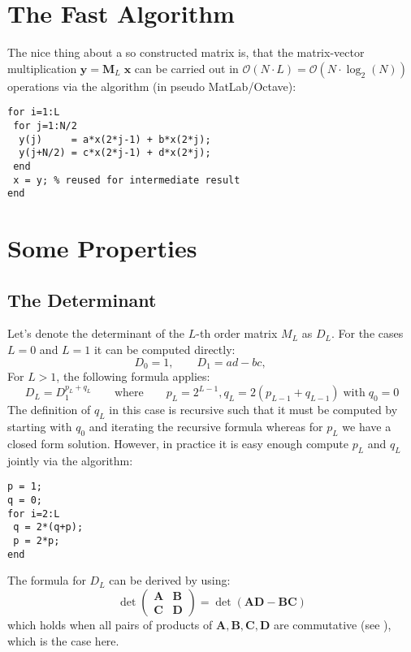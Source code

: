 \section{The Fast Algorithm}
The nice thing about a so constructed matrix is, that the matrix-vector multiplication $\mathbf{y} = \mathbf{M}_L \; \mathbf{x}$ can be carried out in $\mathcal{O}(N \cdot L) = \mathcal{O}(N \cdot \log_2(N))$ operations via the algorithm (in pseudo MatLab/Octave):
\begin{verbatim}
for i=1:L
 for j=1:N/2
  y(j)     = a*x(2*j-1) + b*x(2*j);
  y(j+N/2) = c*x(2*j-1) + d*x(2*j);  
 end
 x = y; % reused for intermediate result
end
\end{verbatim}

\section{Some Properties}

\subsection{The Determinant}
Let's denote the determinant of the $L$-th order matrix $M_L$ as $D_L$. For the cases $L=0$ and $L=1$ it can be computed directly:
\begin{equation}
 D_0 = 1,             \qquad
 D_1 = a d - b c,     \qquad
\end{equation}
For $L > 1$, the following formula applies:
\begin{equation} 
 D_L = D_1^{p_L+q_L} 
 \qquad \text{where} \qquad
 p_L = 2^{L-1}, q_L = 2 (p_{L-1} + q_{L-1}) \; \text{with} \; q_0 = 0
\end{equation}
The definition of $q_L$ in this case is recursive such that it must be computed by starting with $q_0$ and iterating the recursive formula whereas for $p_L$ we have a closed form solution. However, in practice it is easy enough compute $p_L$ and $q_L$ jointly via the algorithm:
\begin{verbatim}
p = 1;
q = 0;
for i=2:L
 q = 2*(q+p);
 p = 2*p;
end
\end{verbatim}
The formula for $D_L$ can be derived by using:
\begin{equation} 
 \det
 \begin{pmatrix}
 \mathbf{A} & \mathbf{B} \\
 \mathbf{C} & \mathbf{D} 
 \end{pmatrix}
 = 
 \det(\mathbf{A D} - \mathbf{B C})
\end{equation}
which holds when all pairs of products of $\mathbf{A}, \mathbf{B}, \mathbf{C}, \mathbf{D}$ are commutative (see \cite{Sil}), which is the case here.

